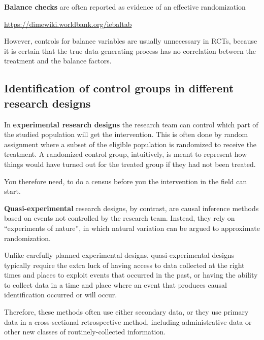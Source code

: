 \textbf{Balance checks}
are often reported as evidence of an effective randomization

 \url{https://dimewiki.worldbank.org/iebaltab}
 
 
However, controls for balance variables are usually unnecessary in RCTs,
because it is certain that the true data-generating process
has no correlation between the treatment and the balance factors.


\subsection{Identification of control groups in different research designs}


In \textbf{experimental research designs} the research team can control which part of the studied population will get the intervention. This is often done by random assignment
where a subset of the eligible population is randomized to receive the treatment. 
A randomized control group, intuitively, is meant to represent
how things would have turned out for the treated group
if they had not been treated.

You therefore need, to do a census before you the intervention in the field can start. 


\textbf{Quasi-experimental} research designs,
by contrast, are causal inference methods based on events not controlled by the research team. Instead, they rely on ``experiments of nature'',
in which natural variation can be argued to approximate randomization. 

Unlike carefully planned experimental designs,
quasi-experimental designs typically require the extra luck
of having access to data collected at the right times and places
to exploit events that occurred in the past,
or having the ability to collect data in a time and place
where an event that produces causal identification occurred or will occur.

Therefore, these methods often use either secondary data,
or they use primary data in a cross-sectional retrospective method,
including administrative data or other new classes of routinely-collected information.

